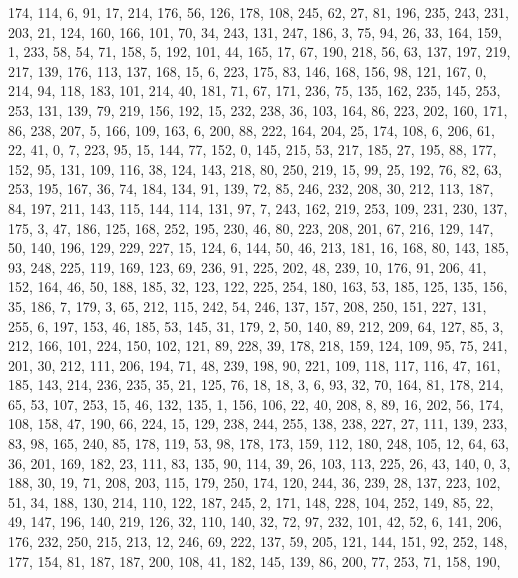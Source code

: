 \begin{DoxyCode}
       174, 114, 6, 91, 17, 214, 176, 56, 126, 178, 108, 245, 62, 27, 81, 196, 235, 243, 231, 203, 21, 124, 160,
       166, 101, 70, 34, 243, 131, 247, 186, 3, 75, 94, 26, 33, 164, 159, 1, 233, 58, 54, 71, 158, 5, 192, 101, 44,
       165, 17, 67, 190, 218, 56, 63, 137, 197, 219, 217, 139, 176, 113, 137, 168, 15, 6, 223, 175, 83, 146, 168,
       156, 98, 121, 167, 0, 214, 94, 118, 183, 101, 214, 40, 181, 71, 67, 171, 236, 75, 135, 162, 235, 145, 253, 253,
       131, 139, 79, 219, 156, 192, 15, 232, 238, 36, 103, 164, 86, 223, 202, 160, 171, 86, 238, 207, 5, 166, 109,
       163, 6, 200, 88, 222, 164, 204, 25, 174, 108, 6, 206, 61, 22, 41, 0, 7, 223, 95, 15, 144, 77, 152, 0, 145,
       215, 53, 217, 185, 27, 195, 88, 177, 152, 95, 131, 109, 116, 38, 124, 143, 218, 80, 250, 219, 15, 99, 25,
       192, 76, 82, 63, 253, 195, 167, 36, 74, 184, 134, 91, 139, 72, 85, 246, 232, 208, 30, 212, 113, 187, 84, 197,
       211, 143, 115, 144, 114, 131, 97, 7, 243, 162, 219, 253, 109, 231, 230, 137, 175, 3, 47, 186, 125, 168, 252,
       195, 230, 46, 80, 223, 208, 201, 67, 216, 129, 147, 50, 140, 196, 129, 229, 227, 15, 124, 6, 144, 50, 46,
       213, 181, 16, 168, 80, 143, 185, 93, 248, 225, 119, 169, 123, 69, 236, 91, 225, 202, 48, 239, 10, 176, 91,
       206, 41, 152, 164, 46, 50, 188, 185, 32, 123, 122, 225, 254, 180, 163, 53, 185, 125, 135, 156, 35, 186, 7,
       179, 3, 65, 212, 115, 242, 54, 246, 137, 157, 208, 250, 151, 227, 131, 255, 6, 197, 153, 46, 185, 53, 145, 31,
       179, 2, 50, 140, 89, 212, 209, 64, 127, 85, 3, 212, 166, 101, 224, 150, 102, 121, 89, 228, 39, 178, 218,
       159, 124, 109, 95, 75, 241, 201, 30, 212, 111, 206, 194, 71, 48, 239, 198, 90, 221, 109, 118, 117, 116, 47,
       161, 185, 143, 214, 236, 235, 35, 21, 125, 76, 18, 18, 3, 6, 93, 32, 70, 164, 81, 178, 214, 65, 53, 107, 253,
       15, 46, 132, 135, 1, 156, 106, 22, 40, 208, 8, 89, 16, 202, 56, 174, 108, 158, 47, 190, 66, 224, 15, 129,
       238, 244, 255, 138, 238, 227, 27, 111, 139, 233, 83, 98, 165, 240, 85, 178, 119, 53, 98, 178, 173, 159, 112,
       180, 248, 105, 12, 64, 63, 36, 201, 169, 182, 23, 111, 83, 135, 90, 114, 39, 26, 103, 113, 225, 26, 43, 140,
       0, 3, 188, 30, 19, 71, 208, 203, 115, 179, 250, 174, 120, 244, 36, 239, 28, 137, 223, 102, 51, 34, 188, 130,
       214, 110, 122, 187, 245, 2, 171, 148, 228, 104, 252, 149, 85, 22, 49, 147, 196, 140, 219, 126, 32, 110, 140,
       32, 72, 97, 232, 101, 42, 52, 6, 141, 206, 176, 232, 250, 215, 213, 12, 246, 69, 222, 137, 59, 205, 121,
       144, 151, 92, 252, 148, 177, 154, 81, 187, 187, 200, 108, 41, 182, 145, 139, 86, 200, 77, 253, 71, 158, 190,

\end{DoxyCode}
